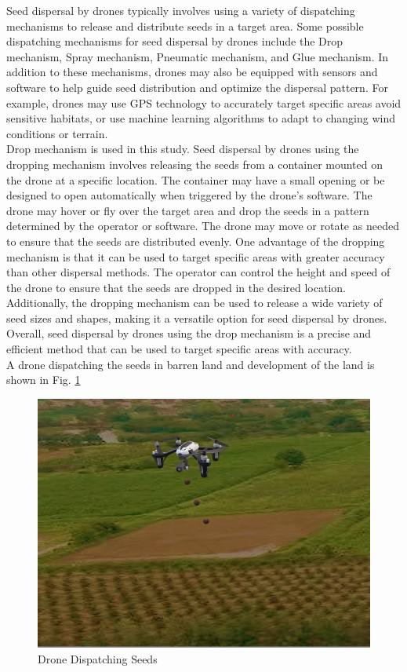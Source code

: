 \documentclass[conference]{IEEEtran}
\begin{document}
Seed dispersal by drones typically involves using a variety of dispatching mechanisms to release and distribute seeds in a target area\cite{7}. Some possible dispatching mechanisms for seed dispersal by drones include the Drop mechanism, Spray mechanism, Pneumatic mechanism, and Glue mechanism. In addition to these mechanisms, drones may also be equipped with sensors and software to help guide seed distribution and optimize the dispersal pattern. For example, drones may use GPS technology to accurately target specific areas avoid sensitive habitats, or use machine learning algorithms to adapt to changing wind conditions or terrain.
\\Drop mechanism is used in this study. Seed dispersal by drones using the dropping mechanism involves releasing the seeds from a container mounted on the drone at a specific location. The container may have a small opening or be designed to open automatically when triggered by the drone's software. The drone may hover or fly over the target area and drop the seeds in a pattern determined by the operator or software. The drone may move or rotate as needed to ensure that the seeds are distributed evenly. One advantage of the dropping mechanism is that it can be used to target specific areas with greater accuracy than other dispersal methods. The operator can control the height and speed of the drone to ensure that the seeds are dropped in the desired location. Additionally, the dropping mechanism can be used to release a wide variety of seed sizes and shapes, making it a versatile option for seed dispersal by drones. Overall, seed dispersal by drones using the drop mechanism is a precise and efficient method that can be used to target specific areas with accuracy.
\\A drone dispatching the seeds in barren land and development of the land  is shown in Fig. \ref{dis}

\begin{figure}[htp]
    \centering
    \includegraphics[scale = 0.3]{narcondam.png}
    \caption{Drone Dispatching Seeds}
    \label{dis}
\end{figure}
\end{document}
